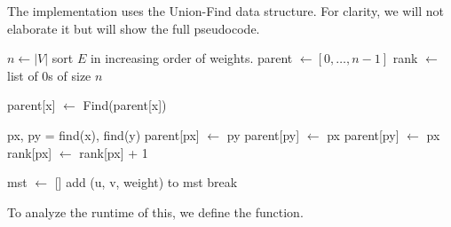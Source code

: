 \documentclass{article}
\begin{document}
      \begin{algo}
        The implementation uses the Union-Find data structure. For clarity, we will not elaborate it but will show the full pseudocode. 
        \begin{algorithm}[H]
          \label{alg:kruskal}
          \begin{algorithmic}
            \State 
              \State $n \gets |V|$ 
              \State sort $E$ in increasing order of weights. 
              \State parent $\gets [0, \ldots, n-1]$ 
              \State rank $\gets$ list of $0$s of size $n$ 

                \State parent[x] $\gets$ Find(parent[x]) 
                \EndIf
                \State {}
              \EndFunction

                \State px, py = find(x), find(y) 
                  \State {}
                \EndIf
                  \State parent[px] $\gets$ py
                  \State parent[py] $\gets$ px
                \Else{}
                  \State parent[py] $\gets$ px 
                  \State rank[px] $\gets$ rank[px] + 1
                \EndIf
                \State {}
              \EndFunction

              \State mst $\gets$ [] 
                  \State add (u, v, weight) to mst
                \EndIf 
                  \State break
                \EndIf 
              \EndFor

              \State {}
            \EndFunction
          \end{algorithmic}
        \end{algorithm}
      \end{algo}
      
      To analyze the runtime of this, we define the function. 
\end{document}
